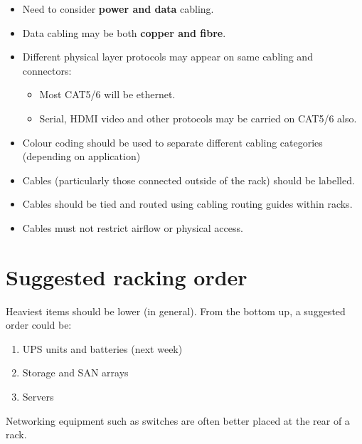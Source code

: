 \documentclass{pgnotes}
\begin{document}
\begin{itemize}
\item Need to consider \textbf{power and data} cabling.
\item Data cabling may be both \textbf{copper and fibre}.
\item Different physical layer protocols may appear on same cabling and connectors:
  \begin{itemize}
  \item Most CAT5/6 will be ethernet.
  \item Serial, HDMI video and other protocols may be carried on CAT5/6 also.
  \end{itemize}
\item Colour coding should be used to separate different cabling categories (depending on application)
\item Cables (particularly those connected outside of the rack) should be labelled.
\item Cables should be tied and routed using cabling routing guides within racks.
\item Cables must not restrict airflow or physical access.
\end{itemize}

\section{Suggested racking order}

Heaviest items should be lower (in general). 
From the bottom up, a suggested order could be:
\begin{enumerate}
\item UPS units and batteries (next week)
\item Storage and SAN arrays
\item Servers 
\end{enumerate}
Networking equipment such as switches are often better placed at the rear of a rack. 
\end{document}
